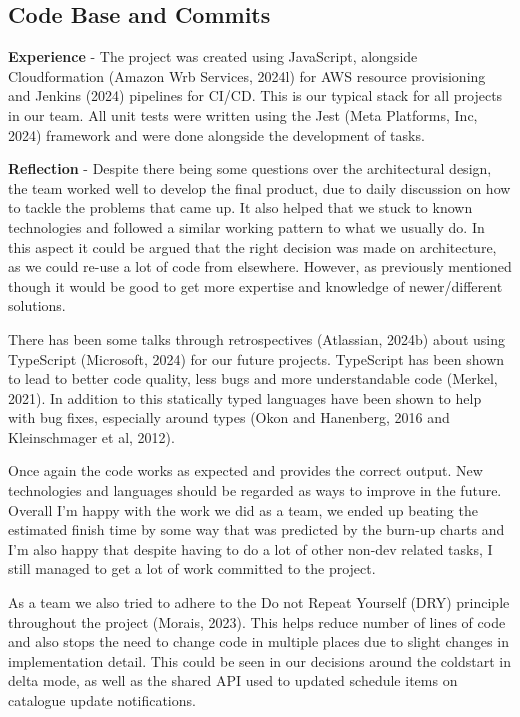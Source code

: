   \newpage
  \subsection{Code Base and Commits}

  \textbf{Experience} - The project was created using JavaScript, alongside Cloudformation (Amazon Wrb Services, 2024l) for AWS resource provisioning and 
  Jenkins (2024) pipelines for CI/CD. This is our typical stack for all projects in our team. All unit tests were written using the Jest 
  (Meta Platforms, Inc, 2024) framework and were done alongside the development of tasks.

  \vspace{0.2cm}
  \textbf{Reflection} - Despite there being some questions over the architectural design, the team worked well to develop the final product, due to daily 
  discussion on how to tackle the problems that came up. It also helped that we stuck to known technologies and followed a similar working pattern to what 
  we usually do. In this aspect it could be argued that the right decision was made on architecture, as we could re-use a lot of code from elsewhere.
  However, as previously mentioned though it would be good to get more expertise and knowledge of newer/different solutions.

  There has been some talks through retrospectives (Atlassian, 2024b) about using TypeScript (Microsoft, 2024) for our future projects. TypeScript has been 
  shown to lead to better code quality, less bugs and more understandable code (Merkel, 2021). In addition to this statically typed languages have been shown
  to help with bug fixes, especially around types (Okon and Hanenberg, 2016 and Kleinschmager et al, 2012).

  Once again the code works as expected and provides the correct output. New technologies and languages should be regarded as ways to improve in the future.
  Overall I'm happy with the work we did as a team, we ended up beating the estimated finish time by some way that was predicted by the burn-up charts and 
  I'm also happy that despite having to do a lot of other non-dev related tasks, I still managed to get a lot of work committed to the project.

  As a team we also tried to adhere to the Do not Repeat Yourself (DRY) principle throughout the project (Morais, 2023). This helps reduce number of lines of 
  code and  also stops the need to change code in multiple places due to slight changes in implementation detail. This could be seen in our decisions around the 
  coldstart in delta mode, as well as the shared API used to updated schedule items on catalogue update notifications.

